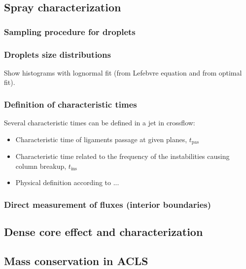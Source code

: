 \subsection{Spray characterization}

\subsubsection{Sampling procedure for droplets}

\subsubsection{Droplets size distributions}

Show histograms with lognormal fit (from Lefebvre equation and from optimal fit).

\subsubsection{Definition of characteristic times}

Several characteristic times can be defined in a jet in crossflow:

\begin{itemize}

	\item Characteristic time of ligaments passage at given planes, $t_\mathrm{pas}$
	
	\item Characteristic time related to the frequency of the instabilities causing column breakup, $t_\mathrm{ins}$
	
	\item Physical definition according to ...

\end{itemize}

\subsubsection{Direct measurement of fluxes (interior boundaries)}
\label{subsubsec:ch5_interior_boundaries}

\subsection{Dense core effect and characterization}
\label{subsec:ch5_dense_core_in_ACLS_simus}

\subsection{Mass conservation in ACLS}

